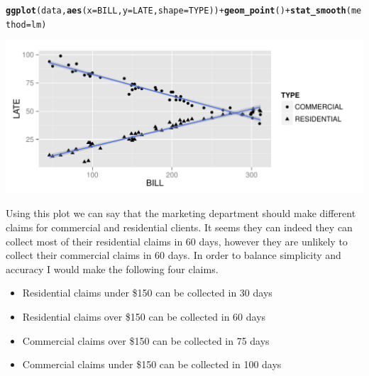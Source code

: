 \documentclass{article}\usepackage{graphicx, color}
\makeatletter
\def\maxwidth{ %
  \ifdim\Gin@nat@width>\linewidth
    \linewidth
  \else
    \Gin@nat@width
  \fi
}
\newcommand{\hlfunctioncall}[1]{\textcolor[rgb]{0.501960784313725,0,0.329411764705882}{\textbf{#1}}}%
\newenvironment{kframe}{%
 \def\at@end@of@kframe{}%
 \ifinner\ifhmode%
  \def\at@end@of@kframe{\end{minipage}}%
  \begin{minipage}{\columnwidth}%
 \fi\fi%
 \def\FrameCommand##1{\hskip\@totalleftmargin \hskip-\fboxsep
 \colorbox{shadecolor}{##1}\hskip-\fboxsep
     \hskip-\linewidth \hskip-\@totalleftmargin \hskip\columnwidth}%
 \MakeFramed {\advance\hsize-\width
   \@totalleftmargin\z@ \linewidth\hsize
   \@setminipage}}%
 {\par\unskip\endMakeFramed%
 \at@end@of@kframe}
\newenvironment{knitrout}{}{} %
\makeatother
\begin{document}
\begin{knitrout}
\color{fgcolor}\begin{kframe}
\begin{alltt}
\hlfunctioncall{ggplot}(data, \hlfunctioncall{aes}(x = BILL, y = LATE, shape = TYPE)) + \hlfunctioncall{geom_point}() + \hlfunctioncall{stat_smooth}(method = lm)
\end{alltt}
\end{kframe}
\includegraphics[width=\maxwidth]{figure/unnamed-chunk-7} 

\end{knitrout}


Using this plot we can say that the marketing department should make different claims for commercial and residential clients. It seems they can indeed they can collect most of their residential claims in 60 days, however they are unlikely to collect their commercial claims in 60 days. In order to balance simplicity and accuracy I would make the following four claims.

\begin{itemize}
\item Residential claims under \$150 can be collected in 30 days
\item Residential claims over \$150 can be collected in 60 days
\item Commercial claims over \$150 can be collected in 75 days
\item Commercial claims under \$150 can be collected in 100 days
\end{itemize}
\end{document}
